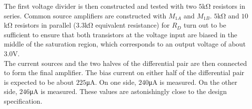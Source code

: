 The first voltage divider is then constructed and tested with two $5$\si{\kilo\ohm} resistors in series.
Common source amplifiers are constructed with $M_{1A}$ and $M_{1B}$.
$5$\si{\kilo\ohm} and $10$\si{\kilo\ohm} resistors in parallel ($3.3$\si{\kilo\ohm} equivalent resistance) for $R_D$ turn out to be sufficient to ensure that both transistors at the voltage input are biased in the middle of the saturation region, which corresponds to an output voltage of about $3.0$\si{\volt}. \\

The current sources and the two halves of the differential pair are then connected to form the final amplifier.
The bias current on either half of the differential pair is expected to be about $225$\si{\micro\ampere}.
On one side, $240$\si{\micro\ampere} is measured.
On the other side, $246$\si{\micro\ampere} is measured.
These values are astonishingly close to the design specification. \\
